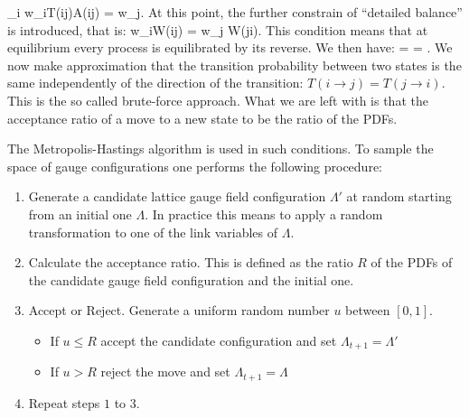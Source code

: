     \sum_i w_iT(i\rightarrow j)A(i\rightarrow j) =  w_j.
\eeq 
At this point, the further constrain of ``detailed balance'' \cite{robert_monte_2004} is introduced, that is:
\beq
    w_iW(i\rightarrow j) =  w_j W(j\rightarrow i).
\eeq 
This condition means that at equilibrium every process is equilibrated by its reverse. We then have:
\beq
     =  = .
\eeq
We now make approximation that the transition probability between two states is the same independently of the direction of the transition: $T(i\rightarrow j) = T(j\rightarrow i)$. This is the so called brute-force approach. What we are left with is that the acceptance ratio of a move to a new state to be the ratio of the PDFs.  

The Metropolis-Hastings algorithm is used in such conditions. To sample the space of gauge configurations one performs the following procedure:
\begin{enumerate}
    \item Generate a candidate lattice gauge field configuration $\Lambda'$ at random starting from an initial one $\Lambda$. In practice this means to apply a random transformation to one of the link variables of $\Lambda$.
    \item Calculate the acceptance ratio. This is defined as the ratio $R$ of the PDFs of the candidate gauge field configuration and the initial one.
    \item Accept or Reject. Generate a uniform random number $u$ between $[0,1]$. 
    \begin{itemize}
        \item If $u \leq R$ accept the candidate configuration and set $\Lambda_{t+1} = \Lambda'$
        \item If $u > R$ reject the move and set $\Lambda_{t+1} = \Lambda$
    \end{itemize}
    \item Repeat steps $1$ to $3$.
\end{enumerate}

